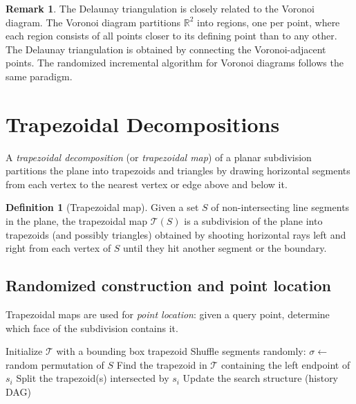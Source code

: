 \documentclass[twoside,12pt]{book}
\theoremstyle{plain}
\theoremstyle{definition}
\newtheorem{definition}[theorem]{Definition}
\newtheorem{remark}[theorem]{Remark}
\theoremstyle{remark}
\begin{document}
\begin{remark}
The Delaunay triangulation is closely related to the Voronoi diagram. The Voronoi diagram partitions $\mathbb{R}^2$ into regions, one per point, where each region consists of all points closer to its defining point than to any other. The Delaunay triangulation is obtained by connecting the Voronoi-adjacent points. The randomized incremental algorithm for Voronoi diagrams follows the same paradigm.
\end{remark}

\section{Trapezoidal Decompositions}
\label{sec:trapezoidal}

A \emph{trapezoidal decomposition} (or \emph{trapezoidal map}) of a planar subdivision partitions the plane into trapezoids and triangles by drawing horizontal segments from each vertex to the nearest vertex or edge above and below it.

\begin{definition}[Trapezoidal map]
Given a set $S$ of non-intersecting line segments in the plane, the trapezoidal map $\mathcal{T}(S)$ is a subdivision of the plane into trapezoids (and possibly triangles) obtained by shooting horizontal rays left and right from each vertex of $S$ until they hit another segment or the boundary.
\end{definition}

\subsection{Randomized construction and point location}

Trapezoidal maps are used for \emph{point location}: given a query point, determine which face of the subdivision contains it.

\begin{algorithm}
\caption{Randomized Trapezoidal Map Construction}
\label{alg:trapezoidal}
\begin{algorithmic}[1]
\State Initialize $\mathcal{T}$ with a bounding box trapezoid
\State Shuffle segments randomly: $\sigma \leftarrow$ random permutation of $S$
    \State Find the trapezoid in $\mathcal{T}$ containing the left endpoint of $s_i$
    \State Split the trapezoid(s) intersected by $s_i$
    \State Update the search structure (history DAG)
\EndFor
\end{algorithmic}
\end{algorithm}
\end{document}
